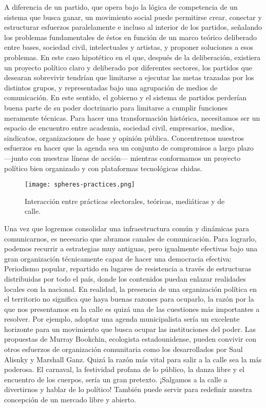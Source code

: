 A diferencia de un partido, que opera bajo la lógica de competencia de un sistema que busca ganar, un movimiento social puede permitirse crear, conectar y estructurar esfuerzos paralelamente e incluso al interior de los partidos, señalando los problemas fundamentales de éstos en función de un marco teórico deliberado entre bases, sociedad civil, intelectuales y artistas, y proponer soluciones a esos problemas. En este caso hipotético en el que, después de la deliberación, existiera un proyecto político claro y deliberado por diferentes sectores, los partidos que desearan sobrevivir tendrían que limitarse a ejecutar las metas trazadas por los distintos grupos, y representadas bajo una agrupación de medios de comunicación. En este sentido, el gobierno y el sistema de partidos perderían buena parte de su poder doctrinario para limitarse a cumplir funciones meramente técnicas. Para hacer una transformación histórica, necesitamos ser un espacio de encuentro entre academia, sociedad civil, empresarios, medios, sindicatos, organizaciones de base y opinión pública. Concentremos nuestros esfuerzos en hacer que la agenda sea un conjunto de compromisos a largo plazo ---junto con nuestras líneas de acción--- mientras conformamos un proyecto político bien organizado y con plataformas tecnológicas chidas.

\begin{figure}[htbp]
	\centering
	\texttt{[image: spheres-practices.png]}
	\caption{Interacción entre prácticas electorales, teóricas, mediáticas y de calle.}
	\label{fig:interacciones}
\end{figure}

Una vez que logremos consolidar una infraestructura común y dinámicas para comunicarnos, es necesario que abramos canales de comunicación. Para lograrlo, podemos recurrir a estrategias muy antiguas, pero igualmente efectivas bajo una gran organización técnicamente capaz de hacer una democracia efectiva: Periodismo popular, repartido en lugares de resistencia a través de estructuras distribuidas por todo el país, donde los contenidos puedan enlazar realidades locales con la nacional. En realidad, la presencia de una organización política en el territorio no significa que haya buenas razones para ocuparlo, la razón por la que nos presentamos en la calle es quizá una de las cuestiones más importantes a resolver. Por ejemplo, adoptar una agenda municipalista sería un excelente horizonte para un movimiento que busca ocupar las instituciones del poder. Las propuestas de Murray Bookchin, ecologista estadounidense, pueden convivir con otros esfuerzos de organización comunitaria como los desarrollados por Saul Alisnky y Marshall Ganz. Quizá la razón más vital para salir a la calle sea la más poderosa. El carnaval, la festividad profana de lo público, la danza libre y el encuentro de los cuerpos, sería un gran pretexto. ¡Salgamos a la calle a divertirnos y hablar de lo político! También puede servir para redefinir nuestra concepción de un mercado libre y abierto.

